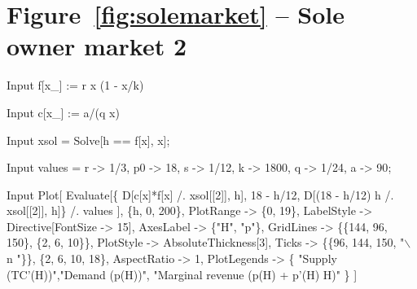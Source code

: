 \documentclass[11pt,fleqn]{book} %
\begin{document}
\section*{Figure~\ref{fig:solemarket} -- Sole owner market 2 }
\small{
\begin{mmaCell}[index=1]{Input}
   f[x_] := r x (1 - x/k)
\end{mmaCell}

\begin{mmaCell}{Input}
   c[x_] := a/(q x)
\end{mmaCell}

\begin{mmaCell}{Input}
   xsol = Solve[h == f[x], x];
\end{mmaCell}

\begin{mmaCell}{Input}
   values = {r -> 1/3, p0 -> 18, s -> 1/12, k -> 1800, q -> 1/24, a -> 90};
\end{mmaCell}

\begin{mmaCell}{Input}
   Plot[
     Evaluate[\{
       D[c[x]*f[x] /. xsol[[2]], h], 18 - h/12, 
       D[(18 - h/12) h /. xsol[[2]], h]\} /. values
     ],
     \{h, 0, 200\}, 
     PlotRange   -> \{0, 19\},
     LabelStyle  -> Directive[FontSize -> 15],
     AxesLabel   -> \{"H", "p"\}, 
     GridLines   -> \{\{144, 96, 150\}, \{2, 6, 10\}\}, 
     PlotStyle   -> AbsoluteThickness[3], 
     Ticks       -> \{\{96, 144, {150, "\(\backslash\)n "\}\}, \{2, 6, 10, 18}\},
     AspectRatio -> 1,
     PlotLegends -> \{
       "Supply (TC'(H))","Demand (p(H))",
       "Marginal revenue (p(H) + p'(H) H)"
       \}
   ]
\end{mmaCell}
}

\end{document}
